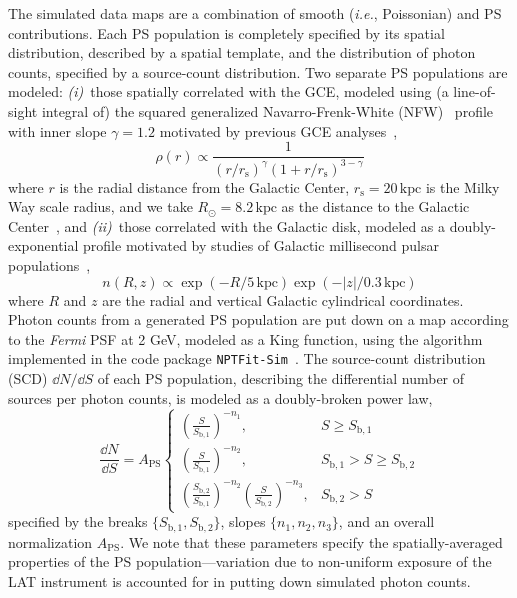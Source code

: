 \documentclass[prd,aps,10pt,nofootinbib,twocolumn,superscriptaddress,preprintnumbers,balancelastpage,longbibliography]{revtex4-1}
\begin{document}
The simulated data maps are a combination of smooth (\emph{i.e.}, Poissonian) and PS contributions. Each PS population is completely specified by its spatial distribution, described by a spatial template, and the distribution of photon counts, specified by a source-count distribution. Two separate PS populations are modeled: \emph{(i)}~those spatially correlated with the GCE, modeled using (a line-of-sight integral of) the squared generalized Navarro-Frenk-White (NFW)~\cite{Navarro:1995iw,Navarro:1996gj} profile with inner slope $\gamma=1.2$ motivated by previous GCE analyses~\cite{Gordon:2013vta,Daylan:2014rsa,Zhou:2014lva},
\begin{equation}
    \label{eq:nfw}
    \rho(r) \propto \frac{1}{\left(r / r_{\mathrm s}\right)^{\gamma}\left(1+r / r_{\mathrm s}\right)^{3-\gamma}}
\end{equation}
where $r$ is the radial distance from the Galactic Center, $r_{\mathrm s}=20\,\mathrm{kpc}$ is the Milky Way scale radius, and we take $R_\odot = 8.2\,\mathrm{kpc}$ as the distance to the Galactic Center~\cite{2020arXiv201202169B,2019A&A...625L..10G}, and \emph{(ii)}~those correlated with the Galactic disk, modeled as a doubly-exponential profile motivated by studies of Galactic millisecond pulsar populations~\cite{Lorimer:2006qs, Bartels:2018xom},
\begin{equation}
    n(R, z) \propto \exp (-R / 5\,\mathrm{kpc}) \exp (-|z| / 0.3\,\mathrm{kpc})
\end{equation}
where $R$ and $z$ are the radial and vertical Galactic cylindrical coordinates.  %
Photon counts from a generated PS population are put down on a map according to the \emph{Fermi} PSF at 2 GeV, modeled as a King function, using the algorithm implemented in the code package \texttt{NPTFit-Sim}~\cite{NPTFit-Sim}. The source-count distribution (SCD) $\dd N /\dd S$ of each PS population, describing the differential number of sources per photon counts, is modeled as a doubly-broken power law,
\begin{equation}
    \label{eq:scd_bpl}
    \frac{\dd N}{\dd S}=A_\mathrm{PS}\left\{\begin{array}{lc}
        \left(\frac{S}{S_{\mathrm b, 1}}\right)^{-n_{1}}, & S \geq S_{\mathrm b, 1} \\
        \left(\frac{S}{S_{\mathrm b, 1}}\right)^{-n_{2}}, & S_{\mathrm b, 1}>S \geq S_{\mathrm b, 2} \\
        \left(\frac{S_{\mathrm b, 2}}{S_{\mathrm b, 1}}\right)^{-n_{2}}\left(\frac{S}{S_{\mathrm b, 2}}\right)^{-n_{3}}, & S_{\mathrm b, 2}>S
        \end{array}\right.
\end{equation}
specified by the breaks $\{S_{\mathrm b, 1}, S_{\mathrm b, 2}\}$, slopes $\{n_1, n_2, n_3\}$, and an overall normalization $A_\mathrm{PS}$. We note that these parameters specify the {spatially-averaged} properties of the PS population---variation due to non-uniform exposure of the LAT instrument is accounted for in putting down simulated photon counts.
\end{document}
